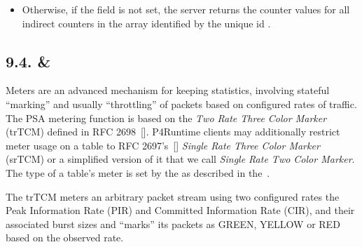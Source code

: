\documentclass[11pt]{article}
\begin{document}
{\begin{itemize}
\item{}
Otherwise, if the  field is not set, the server returns the counter
values for all indirect counters in the array identified by the unique id
.%
\end{itemize}%

\subsection{9.4.\hspace*{0.5em} \& }\label{sec-meter-directmeter}%

\noindent{}Meters are an advanced mechanism for keeping statistics, involving stateful
\textquotedblleft{}marking\textquotedblright{} and usually \textquotedblleft{}throttling\textquotedblright{} of packets based on configured rates of
traffic. The PSA metering function is based on the \emph{Two Rate Three Color Marker}
(trTCM) defined in RFC 2698~[]. P4Runtime clients may additionally
restrict meter usage on a table to RFC 2697's~[] \emph{Single Rate Three
Color Marker} (srTCM) or a simplified version of it that we call \emph{Single Rate
Two Color Marker}. The type of a table's meter is set by the  as
described in the~.%

The trTCM meters an arbitrary packet stream using two configured rates \textemdash{}
the Peak Information Rate (PIR) and Committed Information Rate (CIR), and their
associated burst sizes \textemdash{} and \textquotedblleft{}marks\textquotedblright{} its packets as GREEN, YELLOW or RED based
on the observed rate.%

}
\end{document}
